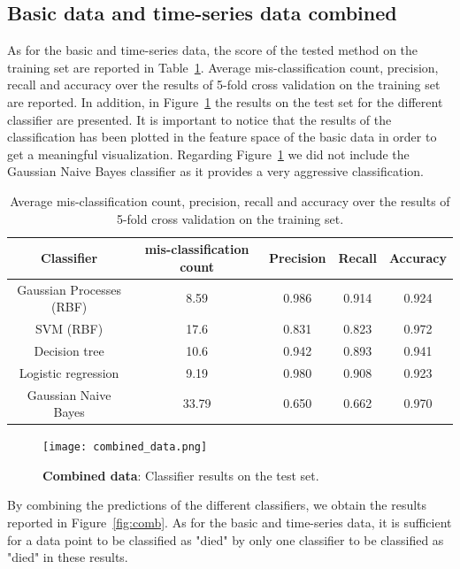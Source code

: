 \documentclass[a4paper,11pt]{article}
\begin{document}
\subsection{Basic data and time-series data combined}\label{sec:res_comb_data}
As for the basic and time-series data, the score of the tested method on the training set are reported in Table~\ref{tab:combscores}. Average mis-classification count, precision, recall and accuracy over the results of 5-fold cross validation on the training set are reported. In addition, in Figure~\ref{fig:combtest} the results on the test set for the different classifier are presented. It is important to notice that the results of the classification has been plotted in the feature space of the basic data in order to get a meaningful visualization. Regarding Figure~\ref{fig:combtest} we did not include the Gaussian Naive Bayes classifier as it provides a very aggressive classification.

\begin{table}[H]
    \centering
    \begin{tabular}{|c|c|c|c|c|}
    \hline
        Classifier & mis-classification count & Precision & Recall & Accuracy \\
    \hline
        Gaussian Processes (RBF)& 8.59  & 0.986 & 0.914 & 0.924\\
        SVM (RBF)               & 17.6  & 0.831 & 0.823 & 0.972\\
        Decision tree           & 10.6  & 0.942 & 0.893 & 0.941\\
        Logistic regression     & 9.19  & 0.980 & 0.908 & 0.923\\
        Gaussian Naive Bayes    & 33.79 & 0.650 & 0.662 & 0.970\\
    \hline
    \end{tabular}
    \caption{Average mis-classification count, precision, recall and accuracy over the results of 5-fold cross validation on the training set.}
    \label{tab:combscores}
\end{table}

\begin{figure}[H]
    \centering
\texttt{[image: combined\_data.png]}
    \caption{\textbf{Combined data}: Classifier results on the test set.}
    \label{fig:combtest}
\end{figure}

By combining the predictions of the different classifiers, we obtain the results reported in Figure~\ref{fig:comb}. As for the basic and time-series data, it is sufficient for a data point to be classified as "died" by only one classifier to be classified as "died" in these results.
\end{document}
